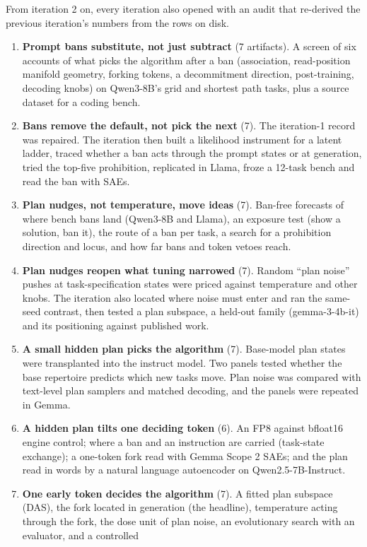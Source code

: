 \documentclass[10pt]{article}
\begin{document}
From iteration 2 on, every iteration also opened with an audit that re-derived the previous iteration's numbers from the rows
on disk.
\begin{enumerate}[label=\textbf{\arabic*.}]
\item \textbf{Prompt bans substitute, not just subtract} (7 artifacts). A screen of six accounts of what picks the algorithm
after a ban (association, read-position manifold geometry, forking tokens, a decommitment direction, post-training,
decoding knobs) on Qwen3-8B's grid and shortest path tasks, plus a source dataset for a coding bench.
\item \textbf{Bans remove the default, not pick the next} (7). The iteration-1 record was repaired. The iteration then built a
likelihood instrument for a latent ladder, traced whether a ban acts through the prompt states or at generation, tried the
top-five prohibition, replicated in Llama, froze a 12-task bench and read the ban with SAEs.
\item \textbf{Plan nudges, not temperature, move ideas} (7). Ban-free forecasts of where bench bans land (Qwen3-8B and
Llama), an exposure test (show a solution, ban it), the route of a ban per task, a search for a prohibition direction and
locus, and how far bans and token vetoes reach.
\item \textbf{Plan nudges reopen what tuning narrowed} (7). Random ``plan noise'' pushes at task-specification states were
priced against temperature and other knobs. The iteration also located where noise must enter and ran the same-seed contrast,
then tested a plan subspace, a held-out family (gemma-3-4b-it) and its positioning against published work.
\item \textbf{A small hidden plan picks the algorithm} (7). Base-model plan states were transplanted into the instruct model.
Two panels tested whether the base repertoire predicts which new tasks move. Plan noise was compared with text-level plan
samplers and matched decoding, and the panels were repeated in Gemma.
\item \textbf{A hidden plan tilts one deciding token} (6). An FP8 against bfloat16 engine control; where a ban and an
instruction are carried (task-state exchange); a one-token fork read with Gemma Scope 2 SAEs; and the plan read in words by
a natural language autoencoder on Qwen2.5-7B-Instruct.
\item \textbf{One early token decides the algorithm} (7). A fitted plan subspace (DAS), the fork located in generation (the headline),
temperature acting through the fork, the dose unit of plan noise, an evolutionary search with an evaluator, and a controlled

\end{enumerate}
\end{document}
